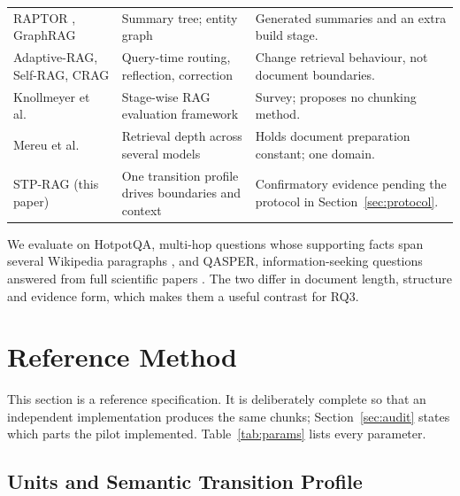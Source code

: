 \documentclass[10pt,a4paper]{article}
\begin{document}
\begin{table}[!htbp]
\begin{tabularx}{\textwidth}{@{}>{\raggedright\arraybackslash}p{}>{\raggedright\arraybackslash}p{}>{\raggedright\arraybackslash}X@{}}
RAPTOR \cite{sarthi2024raptor}, GraphRAG \cite{edge2024graphrag} & Summary tree; entity graph & Generated summaries and an extra build stage. \\
Adaptive-RAG, Self-RAG, CRAG \cite{jeong2024adaptiverag,asai2024selfrag,yan2024crag} & Query-time routing, reflection, correction & Change retrieval behaviour, not document boundaries. \\
Knollmeyer et al.\ \cite{knollmeyer2026evaluation} & Stage-wise RAG evaluation framework & Survey; proposes no chunking method. \\
Mereu et al.\ \cite{mereu2026specializing} & Retrieval depth across several models & Holds document preparation constant; one domain. \\
\midrule
STP-RAG (this paper) & One transition profile drives boundaries and context & Confirmatory evidence pending the protocol in Section~\ref{sec:protocol}. \\
\bottomrule
\end{tabularx}
\end{table}

We evaluate on HotpotQA, multi-hop questions whose supporting facts span several Wikipedia paragraphs \cite{yang2018hotpotqa}, and QASPER, information-seeking questions answered from full scientific papers \cite{dasigi2021qasper}. The two differ in document length, structure and evidence form, which makes them a useful contrast for RQ3.

\FloatBarrier
\section{Reference Method}
\label{sec:method}

This section is a reference specification. It is deliberately complete so that an independent implementation produces the same chunks; Section~\ref{sec:audit} states which parts the pilot implemented. Table~\ref{tab:params} lists every parameter.

\subsection{Units and Semantic Transition Profile}
\end{document}
